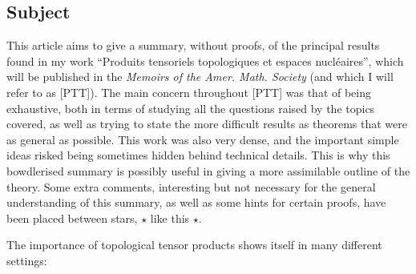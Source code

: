 \documentclass[british]{article}
\newcommand{\oldpage}[1]{\marginpar{\footnotesize$\Big\vert$ \textit{p.~#1}}}
\begin{document}
\subsection*{Subject}\label{subject}

\oldpage{73}

This article aims to give a summary, without proofs, of the principal
results found in my work ``Produits tensoriels topologiques et espaces
nucléaires'', which will be published in the \emph{Memoirs of the Amer.
Math. Society} \autocite{PTT} (and which I will refer to as {[}PTT{]}).
The main concern throughout {[}PTT{]} was that of being exhaustive, both
in terms of studying all the questions raised by the topics covered, as
well as trying to state the more difficult results as theorems that were
as general as possible. This work was also very dense, and the important
simple ideas risked being sometimes hidden behind technical details.
This is why this bowdlerised summary is possibly useful in giving a more
assimilable outline of the theory. Some extra comments, interesting but
not necessary for the general understanding of this summary, as well as
some hints for certain proofs, have been placed between stars, \(\star\)
like this \(\star\).

The importance of topological tensor products shows itself in many
different settings:

\oldpage{74}
\end{document}
